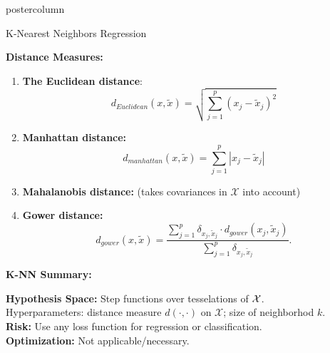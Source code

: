 \documentclass{beamer}
\begin{document}
\begin{frame}[fragile]{}
\begin{columns}
\begin{column}{.31\textwidth}
\begin{beamercolorbox}[center]{postercolumn}
\begin{minipage}{.98\textwidth}
{\begin{myblock}{K-Nearest Neighbors Regression}
\hspace*{1ex}

\begin{codebox}
\textbf{Distance Measures: }
\end{codebox}

\begin{enumerate}
    \item \textbf{The Euclidean distance}:
    \begin{equation*}
      d_{Euclidean}\left(x, \tilde{x}\right) = \sqrt{\sum_{j=1}^p(x_j- \tilde{x}_j)^2}
    \end{equation*}
    \item \textbf{Manhattan distance:}%
        \begin{equation*}
          d_{manhattan}(x, \tilde{x}) = \sum_{j=1}^p |x_j - \tilde{x}_j|
        \end{equation*}
      \item \textbf{Mahalanobis distance:} (takes covariances in $\mathcal{X}$ into account)
      
      \item
      \textbf{Gower distance:}
      $$d_{gower}(x,\tilde{x}) = \frac{\sum_{j=1}^p \delta_{x_j,\tilde{x}_j} \cdot d_{gower}(x_j,\tilde{x}_j)}{
\sum_{j=1}^p \delta_{x_j,\tilde{x}_j}}.
$$
\end{enumerate}
		\hspace*{1ex}

\begin{codebox}
\textbf{K-NN Summary: }
\end{codebox}
\textbf{Hypothesis Space:} Step functions over tesselations of $\mathcal{X}$.\\
Hyperparameters: distance measure $d(\cdot,\cdot)$ on $\mathcal X$; size of neighborhod $k$.\\

\textbf{Risk:} Use any loss function for regression or classification.\\

\textbf{Optimization:} Not applicable/necessary.\\ 

                    \end{myblock}
				}
			\end{minipage}
		\end{beamercolorbox}
	\end{column}
\end{columns}
\end{frame}
\end{document}
